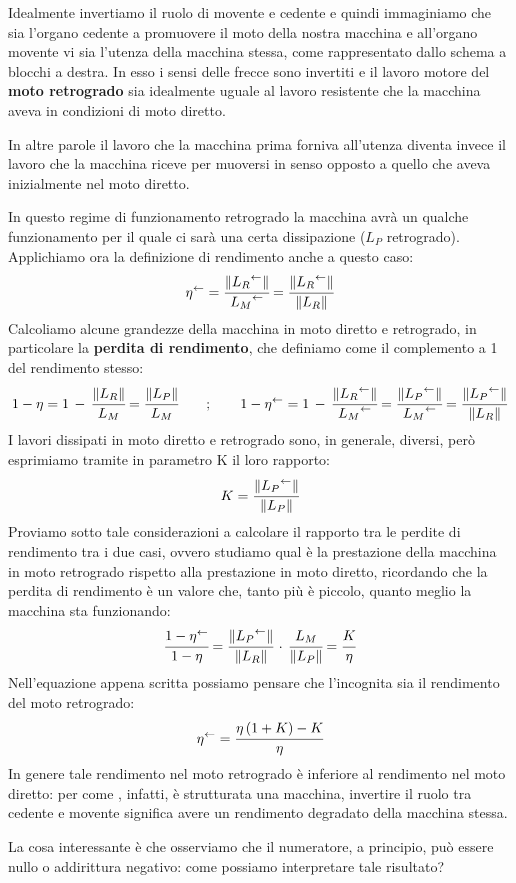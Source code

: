 Idealmente invertiamo il ruolo di movente e cedente e quindi immaginiamo che sia l'organo cedente a promuovere il moto della nostra macchina e all'organo movente vi sia l'utenza della macchina stessa, come rappresentato dallo schema a blocchi a destra. In esso i sensi delle frecce sono invertiti e il lavoro motore del \textbf{moto retrogrado} sia idealmente uguale al lavoro resistente che la macchina aveva in condizioni di moto diretto.

In altre parole il lavoro che la macchina prima forniva all'utenza diventa invece il lavoro che la macchina riceve per muoversi in senso opposto a quello che aveva inizialmente nel moto diretto.

In questo regime di funzionamento retrogrado la macchina avrà un qualche funzionamento per il quale ci sarà una certa dissipazione ($L_P$ retrogrado). Applichiamo ora la definizione di rendimento anche a questo caso:
\[{\eta}^{\leftarrow} = \cfrac{\lVert{L_R}^{\leftarrow}\rVert}{{L_M}^{\leftarrow}} = \cfrac{\lVert{L_R}^{\leftarrow}\rVert}{\lVert L_R\rVert}\]
Calcoliamo alcune grandezze della macchina in moto diretto e retrogrado, in particolare la \textbf{perdita di rendimento}, che definiamo come il complemento a 1 del rendimento stesso:
\[1-\eta = 1\,-\,\cfrac{\lVert L_R\rVert}{L_M} = \cfrac{\lVert L_P\rVert}{L_M}\qquad;\qquad 1-{\eta}^{\leftarrow} = 1\,-\,\cfrac{\lVert{L_R}^{\leftarrow}\rVert}{{L_M}^{\leftarrow}} = \cfrac{\lVert{L_P}^{\leftarrow}\rVert}{{L_M}^{\leftarrow}}=\cfrac{\lVert{L_P}^{\leftarrow}\rVert}{\lVert L_R\rVert}\]
I lavori dissipati in moto diretto e retrogrado sono, in generale, diversi, però esprimiamo tramite in parametro K il loro rapporto:
\[K = \cfrac{\lVert{L_P}^{\leftarrow}\rVert}{\lVert L_P\rVert}\]
Proviamo sotto tale considerazioni a calcolare il rapporto tra le perdite di rendimento tra i due casi, ovvero studiamo qual è la prestazione della macchina in moto retrogrado rispetto alla prestazione in moto diretto, ricordando che la perdita di rendimento è un valore che, tanto più è piccolo, quanto meglio la macchina sta funzionando:
\[\cfrac{1-{\eta}^{\leftarrow}}{1-\eta} =  \cfrac{\lVert{L_P}^{\leftarrow}\rVert}{\lVert L_R\rVert}\,\cdot\,\cfrac{L_M}{\lVert L_P\rVert} = \cfrac{K}{\eta}\]
Nell'equazione appena scritta possiamo pensare che l'incognita sia il rendimento del moto retrogrado:
\[{\eta}^{\leftarrow} = \cfrac{\eta\,(1+K) - K}{\eta}\]
In genere tale rendimento nel moto retrogrado è inferiore al rendimento nel moto diretto: per come , infatti, è strutturata una macchina, invertire il ruolo tra cedente e movente significa avere un rendimento degradato della macchina stessa.

La cosa interessante è che osserviamo che il numeratore, a principio, può essere nullo o addirittura negativo: come possiamo interpretare tale risultato?

